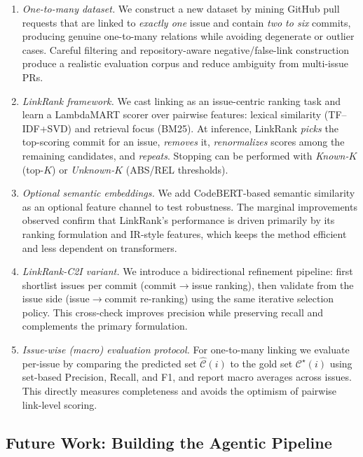 \begin{enumerate}
	\item \textit{One-to-many dataset.} We construct a new dataset by mining GitHub pull requests that are linked to \emph{exactly one} issue and contain \emph{two to six} commits, producing genuine one-to-many relations while avoiding degenerate or outlier cases. Careful filtering and repository-aware negative/false-link construction produce a realistic evaluation corpus and reduce ambiguity from multi-issue PRs.

	\item \textit{LinkRank framework.} We cast linking as an issue-centric ranking task and learn a LambdaMART scorer over pairwise features: lexical similarity (TF--IDF{+}SVD) and retrieval focus (BM25). At inference, LinkRank \emph{picks} the top-scoring commit for an issue, \emph{removes} it, \emph{renormalizes} scores among the remaining candidates, and \emph{repeats}. Stopping can be performed with \emph{Known-$K$} (top-$K$) or \emph{Unknown-$K$} (ABS/REL thresholds).

	\item \textit{Optional semantic embeddings.} We add CodeBERT-based semantic similarity as an optional feature channel to test robustness. The marginal improvements observed confirm that LinkRank’s performance is driven primarily by its ranking formulation and IR-style features, which keeps the method efficient and less dependent on transformers.

	\item \textit{LinkRank-C2I variant.} We introduce a bidirectional refinement pipeline: first shortlist issues per commit (commit$\rightarrow$issue ranking), then validate from the issue side (issue$\rightarrow$commit re-ranking) using the same iterative selection policy. This cross-check improves precision while preserving recall and complements the primary formulation.

	\item \textit{Issue-wise (macro) evaluation protocol.} For one-to-many linking we evaluate per-issue by comparing the predicted set $\widehat{\mathcal{C}}(i)$ to the gold set $\mathcal{C}^\star(i)$ using set-based Precision, Recall, and F1, and report macro averages across issues. This directly measures completeness and avoids the optimism of pairwise link-level scoring.
\end{enumerate}

\subsection*{Future Work: Building the Agentic Pipeline}

